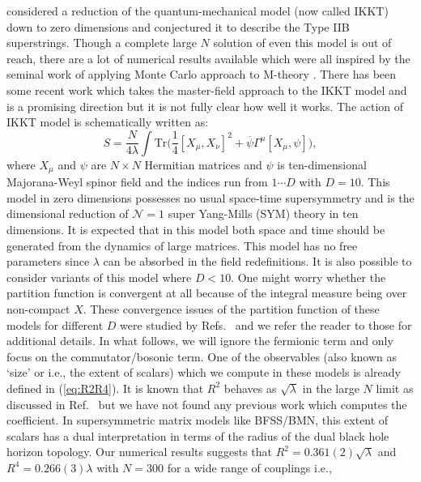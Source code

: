\documentclass[letter,11pt]{article}
\begin{document}
\cite{Ishibashi:1996xs} considered a reduction of the quantum-mechanical model (now called IKKT) down to zero 
dimensions and conjectured it to describe the Type IIB superstrings. Though a complete large $N$ solution of even this model is out of reach, there are a lot of numerical results available which were all inspired by the seminal work of applying Monte Carlo approach to M-theory \cite{Krauth:1998xh}. There has been some recent work which takes the master-field approach to the IKKT model \cite{Klinkhamer:2021wrv} and is a promising direction but it is not fully clear how well it works. The action of IKKT model is schematically written as:
\begin{equation}
	\label{eq:IKKT} 
S = \frac{N}{4\lambda} \int \mbox{Tr} \Big( \frac{1}{4} [X_\mu, X_\nu]^{2} + \overline{\psi} \Gamma^{\mu} [X_{\mu},\psi] \Big), 
\end{equation}
where $X_{\mu}$ and $\psi$ are $N \times N$ Hermitian matrices and $\psi$ is ten-dimensional Majorana-Weyl spinor field and the indices run from $ 1 \cdots D$ with $D=10$. This model in zero dimensions possesses no usual space-time supersymmetry and is the dimensional reduction of $\mathcal{N}=1$ super Yang-Mills (SYM) theory in ten dimensions. It is expected that in this model both space and time should be generated from the dynamics of large matrices. This model has no free parameters since $\lambda$ can be absorbed in the field redefinitions. It is also possible to consider variants of this model where $D < 10$. One might worry whether the partition function is convergent at all because of the integral measure being over non-compact $X$. These convergence issues of the partition function of these models for different $D$ were studied by Refs.~\cite{Krauth:1998yu,Krauth:1999qw} and we
refer the reader to those for additional details.  In what follows, we will ignore the fermionic 
term and only focus on the commutator/bosonic term. One of the observables (also known as `size' or i.e., the extent of scalars) which we compute in these models is already defined in (\ref{eq:R2R4}). It is known that $R^2$ behaves as $\sqrt{\lambda}$ in the large $N$ limit as discussed in Ref.~\cite{Hotta:1998en} but we have not found any previous work which computes the coefficient. In supersymmetric matrix models like BFSS/BMN, this extent of scalars has a dual interpretation in 
terms of the radius of 
the dual black hole horizon topology.  Our numerical results suggests 
that $R^2 = 0.361(2) \sqrt{\lambda}$ 
and $R^4 = 0.266(3) \lambda$ with $N = 300$ for a wide range of couplings i.e., 
\end{document}
